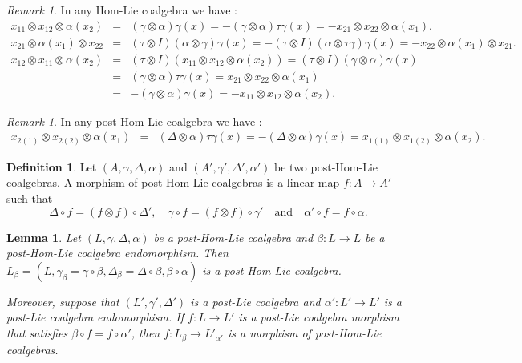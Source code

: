 \documentclass{article}
\newtheorem{lem}[thm]{Lemma}
\theoremstyle{definition}
\newtheorem{defn}[thm]{Definition}
\theoremstyle{remark}
\newtheorem{rem}[thm]{Remark}
\numberwithin{equation}{section}
\begin{document}
\begin{rem}
In any Hom-Lie coalgebra we have :
\begin{eqnarray}
x_{11}\otimes x_{12}\otimes \alpha(x_2)&=&(\gamma\otimes \alpha)\gamma(x)=-(\gamma\otimes \alpha)\tau\gamma(x)=-x_{21}\otimes x_{22}\otimes\alpha(x_1). \label{re1}\\
x_{21}\otimes \alpha(x_1)\otimes x_{22}&=&(\tau\otimes I)(\alpha\otimes \gamma)\gamma(x)
=-(\tau\otimes I)(\alpha\otimes \tau\gamma)\gamma(x)=-x_{22}\otimes \alpha(x_1)\otimes x_{21}\label{re2}.
 \end{eqnarray}
 \begin{eqnarray}
  x_{12}\otimes x_{11}\otimes \alpha(x_2)&=&(\tau\otimes I)(x_{11}\otimes x_{12}\otimes \alpha(x_2))=(\tau\otimes I)(\gamma\otimes \alpha)\gamma(x)\nonumber\\
&=&(\gamma\otimes \alpha)\tau\gamma(x)=x_{21}\otimes x_{22}\otimes \alpha(x_1)\\
&=&-(\gamma\otimes \alpha)\gamma(x)=-x_{11}\otimes x_{12}\otimes \alpha(x_2).
 \end{eqnarray}
\end{rem}
\begin{rem}
In any post-Hom-Lie coalgebra we have :
\begin{eqnarray}
x_{2(1)}\otimes x_{2(2)}\otimes \alpha(x_{1})&=&(\Delta\otimes \alpha)\tau\gamma(x)=-(\Delta\otimes \alpha)\gamma(x)=x_{1(1)}\otimes x_{1(2)}\otimes \alpha(x_{2}).
\end{eqnarray}
\end{rem}
\begin{defn}
 Let $(A, \gamma,  \Delta, \alpha)$ and $(A', \gamma', \Delta', \alpha')$ be two post-Hom-Lie coalgebras.
 A morphism of post-Hom-Lie coalgebras is a linear map $f : A\rightarrow A'$ such that
$$\Delta\circ f=(f\otimes f)\circ\Delta',\quad \gamma\circ f=(f\otimes f)\circ\gamma' \quad\mbox{and}\quad \alpha'\circ f=f\circ\alpha.$$
\end{defn}
\begin{lem}\label{hplm1}
  Let $(L, \gamma, \Delta, \alpha)$ be a post-Hom-Lie coalgebra and $\beta : L\rightarrow L$ be a
post-Hom-Lie coalgebra  endomorphism. Then
$L_\beta=(L, \gamma_\beta=\gamma\circ\beta, \Delta_\beta=\Delta\circ\beta, \beta\circ\alpha)$ is a post-Hom-Lie coalgebra.

Moreover, suppose that $(L', \gamma', \Delta')$ is a post-Lie coalgebra and $\alpha' : L'\rightarrow L'$ is a
post-Lie coalgebra  endomorphism. If $f : L\rightarrow L'$ is a post-Lie coalgebra morphism that satisfies
 $\beta\circ f= f\circ\alpha'$, then $ f : L_\beta\rightarrow L'_{\alpha'}$
is a morphism of post-Hom-Lie coalgebras.
\end{lem}
\end{document}
